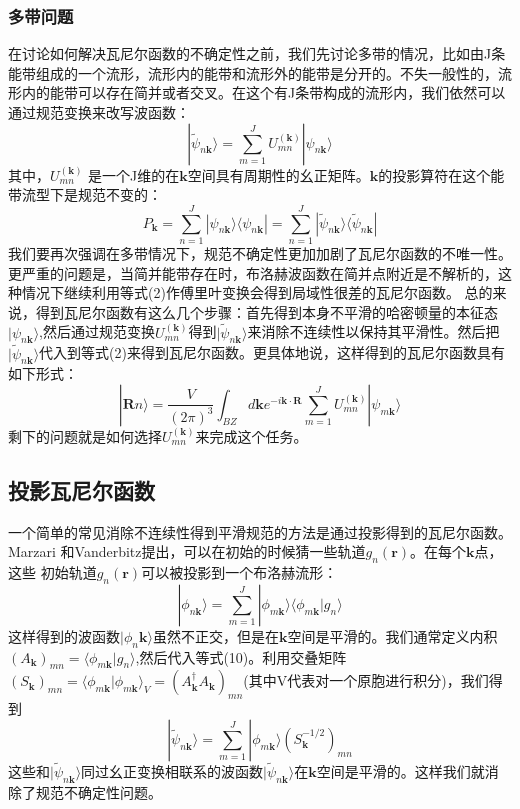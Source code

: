 \subsubsection{多带问题}
在讨论如何解决瓦尼尔函数的不确定性之前，我们先讨论多带的情况，比如由J条能带组成的一个流形，流形内的能带和流形外的能带是分开的。不失一般性的，流形内的能带可以存在简并或者交叉。在这个有J条带构成的流形内，我们依然可以通过规范变换来改写波函数：
\begin{equation}
|\widetilde \psi_{n\bm{k}}\rangle= \sum_{m=1}^{J}U^{(\bm{k})}_{mn} |\psi_{n\bm{k}}\rangle
\end{equation}
其中，$U^{(\bm{k})}_{mn}$ 是一个J维的在$\bm{k}$空间具有周期性的幺正矩阵。$\bm{k}$的投影算符在这个能带流型下是规范不变的：
\begin{equation}
P_{\bm{k}}= \sum_{n=1}^{J}|\psi_{n\bm{k}}\rangle \langle\psi_{n\bm{k}} |= \sum_{n=1}^{J}|\widetilde\psi_{n\bm{k}}\rangle \langle\widetilde \psi_{n\bm{k}} |
\end{equation}
我们要再次强调在多带情况下，规范不确定性更加加剧了瓦尼尔函数的不唯一性。更严重的问题是，当简并能带存在时，布洛赫波函数在简并点附近是不解析的，这种情况下继续利用等式(2)作傅里叶变换会得到局域性很差的瓦尼尔函数。
总的来说，得到瓦尼尔函数有这么几个步骤：首先得到本身不平滑的哈密顿量的本征态$|\psi_{n\bm{k}}\rangle$,然后通过规范变换$U^{(\bm{k})}_{mn}$得到$|\widetilde\psi_{n\bm{k}}\rangle$来消除不连续性以保持其平滑性。然后把$|\widetilde\psi_{n\bm{k}}\rangle$代入到等式(2)来得到瓦尼尔函数。更具体地说，这样得到的瓦尼尔函数具有如下形式：
\begin{equation}
|\bm{R}n \rangle=\frac{V}{(2\pi)^3} \int_{BZ}d\bm{k} e^{-i\bm{k}\cdot\bm{R}} \sum_{m=1}^{J}U^{(\bm{k})}_{mn}|\psi_{m\bm{k}}\rangle
\end{equation}
剩下的问题就是如何选择$U^{(\bm{k})}_{mn}$来完成这个任务。

\subsection{投影瓦尼尔函数}
一个简单的常见消除不连续性得到平滑规范的方法是通过投影得到的瓦尼尔函数。Marzari 和Vanderbitz提出，可以在初始的时候猜一些轨道$g_{n}(\bm{r})$。在每个$\bm{k}$点，这些 初始轨道$g_{n}(\bm{r})$可以被投影到一个布洛赫流形：
\begin{equation}
|\phi_{n\bm{k}}\rangle=\sum_{m=1}^{J}|\phi_{m\bm{k}}\rangle \langle \phi_{m\bm{k}}|g_{n}\rangle
\end{equation}
这样得到的波函数$|\phi_n\bm{k}\rangle$虽然不正交，但是在$\bm{k}$空间是平滑的。我们通常定义内积$(A_{\bm{k}})_{mn}=\langle \phi_{m\bm{k}}|g_{n}\rangle$,然后代入等式(10)。利用交叠矩阵$(S_{\bm{k}})_{mn}=\langle \phi_{m\bm{k}}| \phi_{m\bm{k}}\rangle_V=(A^\dagger_{\bm{k}}A_{\bm{k}})_{mn}$(其中V代表对一个原胞进行积分)，我们得到
\begin{equation}
|\widetilde\psi_{n\bm{k}}\rangle=\sum_{m=1}^{J}|\phi_{m\bm{k}}\rangle (S^{-1/2}_{\bm{k}})_{mn}
\end{equation}
这些和$|\widetilde\psi_{n\bm{k}}\rangle$同过幺正变换相联系的波函数$|\widetilde\psi_{n\bm{k}}\rangle$在$\bm{k}$空间是平滑的。这样我们就消除了规范不确定性问题。

